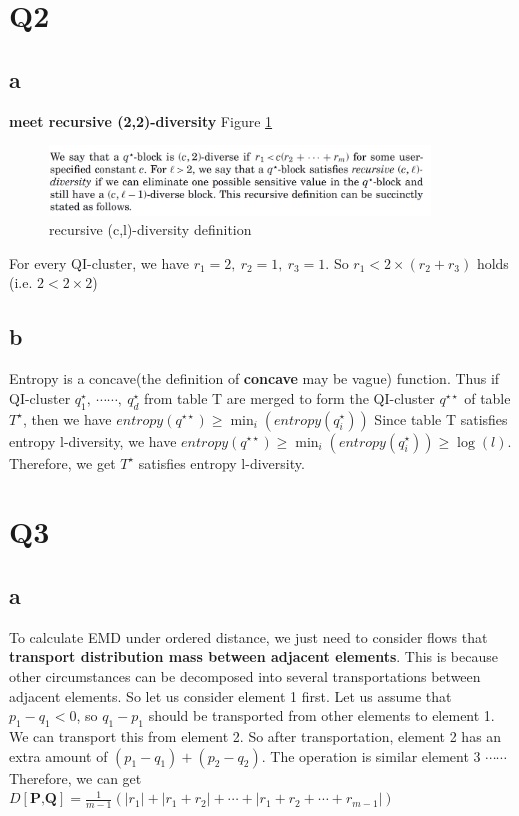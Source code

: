 \documentclass[12pt]{article}
\begin{document}
\section{Q2}
\subsection{a}
\textbf{meet recursive (2,2)-diversity}
\newline
Figure \ref{fig:5}
\begin{figure}[htbp]
    \centering
    \includegraphics[width = 0.9\textwidth]{pics/pic5.png}
    \caption{recursive (c,l)-diversity definition}
    \label{fig:5}
\end{figure}
\newline
For every QI-cluster, we have $r_1=2,\ r_2=1,\ r_3=1$. So $r_1<2\times(r_2+r_3)$ holds (i.e. $2<2\times2$)
\subsection{b}
Entropy is a concave(the definition of \textbf{concave} may be vague) function. Thus if QI-cluster $q_1^\star,\ \cdots\cdots,\ q_d^\star$ from table T are merged
to form the QI-cluster $q^{\star\star}$ of table $T^{\star}$, then we have $entropy(q^{\star\star})\geq \min_i(entropy(q_i^\star))$
\newline
Since table T satisfies entropy l-diversity, we have $entropy(q^{\star\star})\geq \min_i(entropy(q_i^\star))\geq \log(l)$. Therefore, we get $T^\star$
satisfies entropy l-diversity.

\section{Q3}
\subsection{a}
To calculate EMD under ordered distance, we just need to consider flows that \textbf{transport distribution mass between adjacent elements}. This is
because other circumstances can be decomposed into several transportations between adjacent elements.
\newline
So let us consider element 1 first. Let us assume that $p_1-q_1<0$, so $q_1-p_1$ should be transported from other
elements to element 1.
\newline
We can transport this from element 2. So after transportation, element 2 has an extra amount of
$(p_1-q_1)+(p_2-q_2)$. The operation is similar element 3 $\cdots\cdots$
\newline
Therefore, we can get $D[\textbf{P,Q}]=\frac{1}{m-1}(|r_1|+|r_1+r_2|+\cdots+|r_1+r_2+\cdots+r_{m-1}|)$
\end{document}
